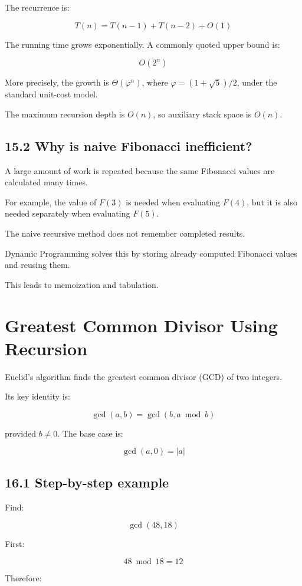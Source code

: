 The recurrence is:


\[
T(n)=T(n-1)+T(n-2)+O(1)
\]


The running time grows exponentially. A commonly quoted upper bound is:


\[
\boxed{O(2^n)}
\]


More precisely, the growth is $\Theta(\varphi^n)$, where $\varphi=(1+\sqrt5)/2$, under the standard unit-cost model.

The maximum recursion depth is $O(n)$, so auxiliary stack space is $O(n)$.

\subsection{15.2 Why is naive Fibonacci inefficient?}

A large amount of work is repeated because the same Fibonacci values are calculated many times.

For example, the value of $F(3)$ is needed when evaluating $F(4)$, but it is also needed separately when evaluating $F(5)$.

The naive recursive method does not remember completed results.

Dynamic Programming solves this by storing already computed Fibonacci values and reusing them.

This leads to memoization and tabulation.

\section{Greatest Common Divisor Using Recursion}

Euclid's algorithm finds the greatest common divisor (GCD) of two integers.

Its key identity is:


\[
\boxed{\gcd(a,b)=\gcd(b,a\bmod b)}
\]


provided $b\neq0$. The base case is:


\[
\boxed{\gcd(a,0)=|a|}
\]


\subsection{16.1 Step-by-step example}

Find:


\[
\gcd(48,18)
\]


First:


\[
48\bmod18=12
\]


Therefore:


